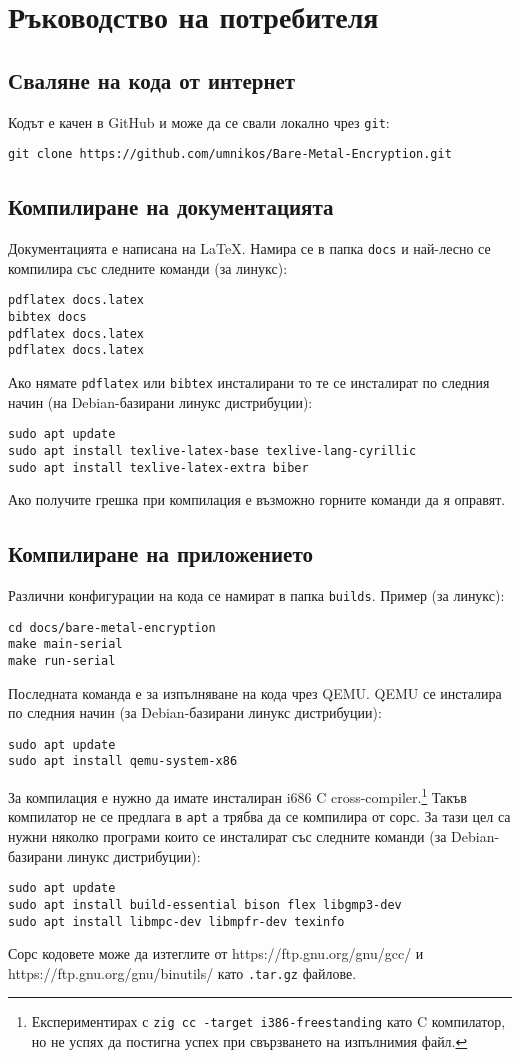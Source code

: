 \section{Ръководство на потребителя}
\subsection{Сваляне на кода от интернет}
Кодът е качен в GitHub и може да се свали локално чрез {\tt git}:
\begin{lstlisting}
git clone https://github.com/umnikos/Bare-Metal-Encryption.git
\end{lstlisting}

\subsection{Компилиране на документацията}
Документацията е написана на \LaTeX{}. Намира се в папка {\tt docs} и най-лесно се компилира със следните команди (за линукс):
\begin{lstlisting}
pdflatex docs.latex
bibtex docs
pdflatex docs.latex
pdflatex docs.latex
\end{lstlisting}
Ако нямате {\tt pdflatex} или {\tt bibtex} инсталирани то те се инсталират по следния начин (на Debian-базирани линукс дистрибуции):
\begin{lstlisting}
sudo apt update
sudo apt install texlive-latex-base texlive-lang-cyrillic
sudo apt install texlive-latex-extra biber
\end{lstlisting}
Ако получите грешка при компилация е възможно горните команди да я оправят.

\subsection{Компилиране на приложението}
Различни конфигурации на кода се намират в папка {\tt builds}. Пример (за линукс):
\begin{lstlisting}
cd docs/bare-metal-encryption
make main-serial
make run-serial
\end{lstlisting}
Последната команда е за изпълняване на кода чрез QEMU. QEMU се инсталира по следния начин (за Debian-базирани линукс дистрибуции):
\begin{lstlisting}
sudo apt update
sudo apt install qemu-system-x86
\end{lstlisting}

За компилация е нужно да имате инсталиран i686 C cross-compiler.\footnote{Експериментирах с {\tt zig cc -target i386-freestanding} като C компилатор, но не успях да постигна успех при свързването на изпълнимия файл.} Такъв компилатор не се предлага в {\tt apt} а трябва да се компилира от сорс. За тази цел са нужни няколко програми които се инсталират със следните команди (за Debian-базирани линукс дистрибуции):
\begin{lstlisting}
sudo apt update
sudo apt install build-essential bison flex libgmp3-dev
sudo apt install libmpc-dev libmpfr-dev texinfo
\end{lstlisting}
Сорс кодовете може да изтеглите от https://ftp.gnu.org/gnu/gcc/ и https://ftp.gnu.org/gnu/binutils/ като {\tt .tar.gz} файлове.

